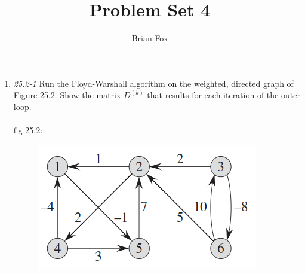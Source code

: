 \documentclass[]{memoir}
\title{Problem Set 4}
\author{Brian Fox}
\date{}
\begin{document}
\maketitle

\begin{enumerate}

\item \textit{25.2-1} Run the Floyd-Warshall algorithm on the weighted, directed graph of Figure 25.2. Show the matrix $D^{(k)}$ that results for each iteration of the outer loop.
\paragraph{} fig 25.2:
\begin{figure}[h]
	\centering
	\includegraphics[scale=.5]{25-2}
\end{figure}


\end{enumerate}
\end{document}
